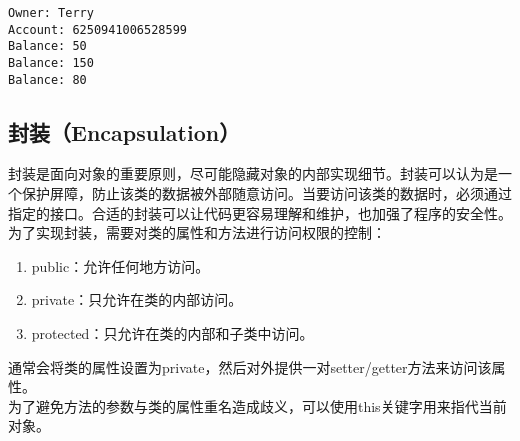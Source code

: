 \begin{tcolorbox}
    \begin{verbatim}
Owner: Terry
Account: 6250941006528599
Balance: 50
Balance: 150
Balance: 80
\end{verbatim}
\end{tcolorbox}

\vspace{0.5cm}

\subsection{封装（Encapsulation）}

封装是面向对象的重要原则，尽可能隐藏对象的内部实现细节。封装可以认为是一个保护屏障，防止该类的数据被外部随意访问。当要访问该类的数据时，必须通过指定的接口。合适的封装可以让代码更容易理解和维护，也加强了程序的安全性。\\

为了实现封装，需要对类的属性和方法进行访问权限的控制：

\begin{enumerate}
    \item public：允许任何地方访问。
    \item private：只允许在类的内部访问。
    \item protected：只允许在类的内部和子类中访问。
\end{enumerate}

通常会将类的属性设置为private，然后对外提供一对setter/getter方法来访问该属性。\\

为了避免方法的参数与类的属性重名造成歧义，可以使用this关键字用来指代当前对象。\\


